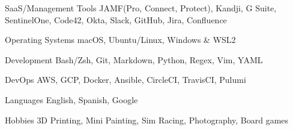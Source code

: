 

\begin{cvskills}
	\cvskill
	{SaaS/Management Tools} %
	{JAMF(Pro, Connect, Protect), Kandji, G Suite, SentinelOne, Code42, Okta, Slack, GitHub, Jira, Confluence} %

	\cvskill
	{Operating Systems} %
	{macOS, Ubuntu/Linux, Windows \& WSL2} %

	\cvskill
	{Development} %
	{Bash/Zsh, Git, Markdown, Python, Regex, Vim, YAML} %

	\cvskill
	{DevOps} %
	{AWS, GCP, Docker, Ansible, CircleCI, TravisCI, Pulumi} %

	\cvskill
	{Languages} %
	{English, Spanish, Google} %

	\cvskill
	{Hobbies}
	{3D Printing, Mini Painting, Sim Racing, Photography, Board games}
\end{cvskills}
